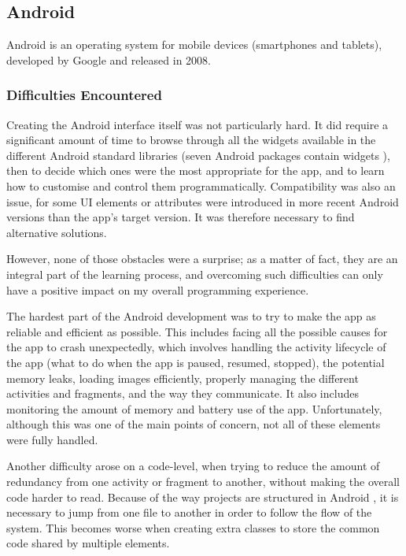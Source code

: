 \documentclass{mproj}
\begin{document}
\subsection{Android}

Android is an operating system for mobile devices (smartphones and tablets), developed by Google and released in 2008.\cite{androidrelease}


\subsubsection*{Difficulties Encountered}

Creating the Android interface itself was not particularly hard. It did require a significant amount of time to browse through all the widgets available in the different Android standard libraries (seven Android packages contain widgets \cite{androidpackages}), then to decide which ones were the most appropriate for the app, and to learn how to customise and control them programmatically. Compatibility was also an issue, for some UI elements or attributes were introduced in more recent Android versions than the app's target version. It was therefore necessary to find alternative solutions. \par

However, none of those obstacles were a surprise; as a matter of fact, they are an integral part of the learning process, and overcoming such difficulties can only have a positive impact on my overall programming experience. \par

The hardest part of the Android development was to try to make the app as reliable and efficient as possible. This includes facing all the possible causes for the app to crash unexpectedly, which involves handling the activity lifecycle of the app \cite{androidlifecycle} (what to do when the app is paused, resumed, stopped), the potential memory leaks, loading images efficiently, properly managing the different activities and fragments, and the way they communicate. It also includes monitoring the amount of memory and battery use of the app.
Unfortunately, although this was one of the main points of concern, not all of these elements were fully handled. \par

Another difficulty arose on a code-level, when trying to reduce the amount of redundancy from one activity or fragment to another, without making the overall code harder to read. Because of the way projects are structured in Android \cite{androidprojects}, it is necessary to jump from one file to another in order to follow the flow of the system. This becomes worse when creating extra classes to store the common code shared by multiple elements.
\end{document}
